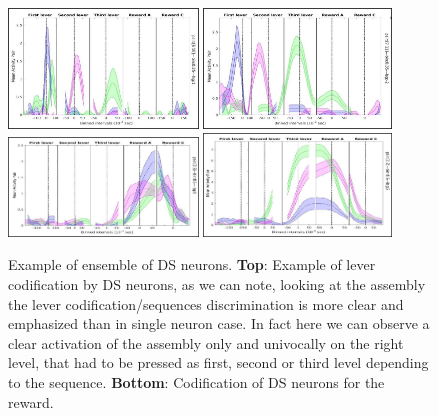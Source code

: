 \documentclass{article}
\begin{document}
\begin{figure}
    \centering
    \includegraphics[width=0.45\textwidth]{DS1}
    \includegraphics[width=0.445\textwidth]{DS2}
    \includegraphics[width=0.45\textwidth]{DS_r1}
    \includegraphics[width=0.445\textwidth]{DS_r2}
    \caption{\footnotesize{Example of ensemble of DS neurons. \textbf{Top}: Example of lever codification by DS neurons, as we can note, looking at the assembly the lever codification/sequences discrimination is more clear and emphasized than in single neuron case. In fact here we can observe a clear activation of the assembly only and univocally on the right level, that had to be pressed as first, second or third level depending to the sequence. \textbf{Bottom}: Codification of DS neurons for the reward.}}
    \label{fig: DS_Assembly}
\end{figure}
\end{document}
